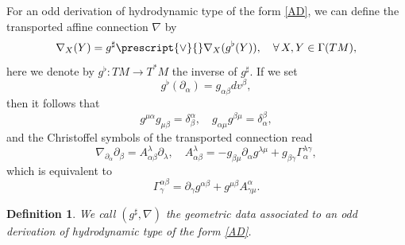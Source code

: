 \documentclass[11pt,a4paper]{amsart}
\numberwithin{equation}{section}
\newtheorem{definition}[theorem]{Definition}
\newcommand{\qa}{\alpha}
\newcommand{\qb}{\beta}
\newcommand{\qd}{\delta}
\newcommand{\qg}{\gamma}
\newcommand{\qp}{\partial}
\newcommand{\Qg}{\Gamma}
\newcommand{\ql}{\lambda}
\numberwithin{equation}{section}
\begin{document}
For an odd derivation of hydrodynamic type of the form \eqref{AD}, we can define the transported affine connection $\nabla$ by 
\[
\nabla_X(Y) = g^\sharp \prescript{\vee}{}\nabla_X(g^\flat (Y)),\quad\forall\, X,Y\in\Qg(TM),
\]
here we denote by $g^\flat\colon TM\to T^*M$ the inverse of $g^\sharp$. If we set 
\[
g^\flat(\qp_\qa) = g_{\qa\qb}dv^\qb,
\]
then it follows that 
\begin{equation}
  \label{AN}
g^{\mu\qa}g_{\mu\qb} = \qd^\qa_\qb,\quad g_{\qa\mu}g^{\qb\mu} = \qd^\qb_\qa,
\end{equation}
and the Christoffel symbols of the transported connection read 
\begin{equation}
  \label{AM}
\nabla_{\qp_\qa}\qp_\qb = A^\ql_{\qa\qb}\qp_\ql,\quad A^\ql_{\qa\qb} = -g_{\qb\mu}\qp_\qa g^{\ql\mu}+g_{\qb\qg}\Qg^{\ql\qg}_\qa,
\end{equation}
which is equivalent to 
\begin{equation}
  \label{BC}
  \Qg^{\qa\qb}_\qg = \qp_\qg g^{\qa\qb}+g^{\mu\qb}A^\qa_{\qg\mu}.
\end{equation}

\begin{definition}
  We call $(g^\sharp,\nabla)$ the geometric data associated to an odd derivation of hydrodynamic type of the form \eqref{AD}.
\end{definition}
\end{document}
